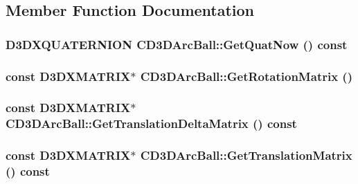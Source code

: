 \subsection{Member Function Documentation}
\hypertarget{class_c_d3_d_arc_ball_ad256f4f111901c148228b745a274d828}{
\subsubsection[{GetQuatNow}]{\setlength{\rightskip}{0pt plus 5cm}D3DXQUATERNION CD3DArcBall::GetQuatNow () const}}
\label{class_c_d3_d_arc_ball_ad256f4f111901c148228b745a274d828}
\hypertarget{class_c_d3_d_arc_ball_a546036e679d57ea3258a4f77ba8b9df8}{
\subsubsection[{GetRotationMatrix}]{\setlength{\rightskip}{0pt plus 5cm}const D3DXMATRIX$\ast$ CD3DArcBall::GetRotationMatrix ()}}
\label{class_c_d3_d_arc_ball_a546036e679d57ea3258a4f77ba8b9df8}
\hypertarget{class_c_d3_d_arc_ball_a4b402efbd90ff4f6fc916eadfcf61482}{
\subsubsection[{GetTranslationDeltaMatrix}]{\setlength{\rightskip}{0pt plus 5cm}const D3DXMATRIX$\ast$ CD3DArcBall::GetTranslationDeltaMatrix () const}}
\label{class_c_d3_d_arc_ball_a4b402efbd90ff4f6fc916eadfcf61482}
\hypertarget{class_c_d3_d_arc_ball_ad100e8818466d636d428e49fbe634f5b}{
\subsubsection[{GetTranslationMatrix}]{\setlength{\rightskip}{0pt plus 5cm}const D3DXMATRIX$\ast$ CD3DArcBall::GetTranslationMatrix () const}}
